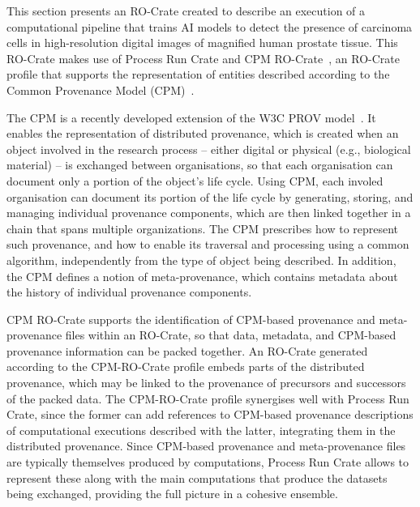 This section presents an RO-Crate created to describe an execution of a computational pipeline that trains AI models to detect the presence of carcinoma cells in high-resolution digital images of magnified human prostate tissue.
%
This RO-Crate makes use of Process Run Crate and CPM RO-Crate~\cite{cpm-ro-crate}, an RO-Crate profile that supports the representation of entities described according to the Common Provenance Model (CPM)~\cite{Wittner 2022,Wittner 2023b, Wittner 2024}.

The CPM is a recently developed extension of the W3C PROV model~\cite{Moreau 2013}. It enables the representation of distributed provenance,
which is created when an object involved in the research process -- either digital or physical (e.g., biological material) -- is exchanged between organisations, so that each organisation can document only a portion of the object’s life cycle.
Using CPM, each involed organisation can document its portion of the life cycle by generating, storing, and managing individual provenance components, which are then linked together in a chain that spans multiple organizations.
The CPM prescribes how to represent such provenance, and how to enable its traversal and processing using a common algorithm, independently from the type of object being described. In addition, the CPM defines a notion of meta-provenance, which contains metadata about the history of individual provenance components.

CPM RO-Crate supports the identification of CPM-based provenance and meta-provenance files within an RO-Crate, so that data, metadata, and CPM-based provenance information can be packed together.
An RO-Crate generated according to the CPM-RO-Crate profile embeds parts of the distributed provenance, which may be linked to the provenance of precursors and successors of the packed data.
The CPM-RO-Crate profile synergises well with Process Run Crate, since the former can add references to CPM-based provenance descriptions of computational executions described with the latter, integrating them in the distributed provenance. Since CPM-based provenance and meta-provenance files are typically themselves produced by computations, Process Run Crate allows to represent these along with the main computations that produce the datasets being exchanged, providing the full picture in a cohesive ensemble.

